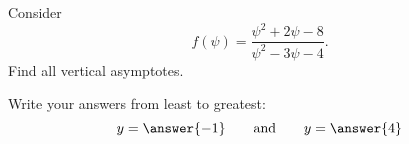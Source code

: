 \documentclass{ximera}
\author{Bart Snapp}
\begin{document}
\begin{exercise}
Consider 
\[
f(\psi) = \frac{\psi ^2+2 \psi -8}{\psi ^2-3 \psi -4}.
\]
Find all vertical asymptotes.
\begin{prompt}
\begin{multipleChoice}
\end{multipleChoice}
\begin{exercise}Write your answers from least to greatest:
\[
y=\answer{-1}\qquad\text{and}\qquad y=\answer{4}
\]
\end{exercise}
\end{prompt}
\end{exercise}
\end{document}
